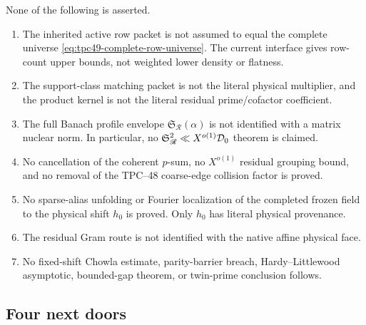 None of the following is asserted.
\begin{enumerate}[label=\textup{(\roman*)},leftmargin=2.4em]
 \item The inherited active row packet is not assumed to equal the
       complete universe \eqref{eq:tpc49-complete-row-universe}.  The
       current interface gives row-count upper bounds, not weighted
       lower density or flatness.
 \item The support-class matching packet is not the literal physical
       multiplier, and the product kernel is not the literal residual
       prime/cofactor coefficient.
 \item The full Banach profile envelope
       \(\mathfrak S_{\mathscr R}(\alpha)\) is not identified with a
       matrix nuclear norm.  In particular, no
       \(\mathfrak S_{\mathscr R}^2\ll X^{o(1)}\mathcal D_0\) theorem is claimed.
 \item No cancellation of the coherent \(p\)-sum, no
       \(X^{o(1)}\) residual grouping bound, and no removal of the
       TPC--48 coarse-edge collision factor is proved.
 \item No sparse-alias unfolding or Fourier localization of the
       completed frozen field to the physical shift \(h_0\) is proved.
       Only \(h_0\) has literal physical provenance.
 \item The residual Gram route is not identified with the native affine
       physical face.
 \item No fixed-shift Chowla estimate, parity-barrier breach,
       Hardy--Littlewood asymptotic, bounded-gap theorem, or twin-prime
       conclusion follows.
\end{enumerate}

\subsection{Four next doors}

